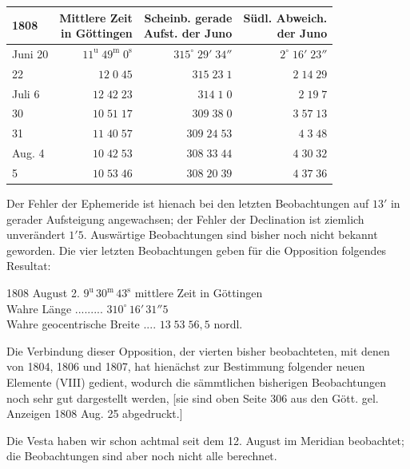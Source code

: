 \begin{center}\fontsize{10}{12}\selectfont\setlength{\tabcolsep}{3pt}\renewcommand{\arraystretch}{1.15}\begin{tabular}{lrrr}
1808 & \shortstack{Mittlere Zeit\\in Göttingen} & \shortstack{Scheinb. gerade\\Aufst. der Juno} & \shortstack{Südl. Abweich.\\der Juno}\\\hline
Juni 20 & $11^{\text{u}}\;49^{\text{m}}\;0^{\text{s}}$ & $315^\circ\;29'\;34''$ & $2^\circ\;16'\;23''$\\
22 & $12\;0\;45$ & $315\;23\;1$ & $2\;14\;29$\\
Juli 6 & $12\;42\;23$ & $314\;1\;0$ & $2\;19\;7$\\
30 & $10\;51\;17$ & $309\;38\;0$ & $3\;57\;13$\\
31 & $11\;40\;57$ & $309\;24\;53$ & $4\;3\;48$\\
Aug. 4 & $10\;42\;53$ & $308\;33\;44$ & $4\;30\;32$\\
5 & $10\;53\;46$ & $308\;20\;39$ & $4\;37\;36$\\
\end{tabular}\end{center}


\par\indent Der Fehler der Ephemeride ist hienach bei den letzten Beobachtungen auf $13'$ in gerader Aufsteigung angewachsen; der Fehler der Declination ist ziemlich unverändert $1'5$. Auswärtige Beobachtungen sind bisher noch nicht bekannt geworden. Die vier letzten Beobachtungen geben für die Opposition folgendes Resultat:

\begin{center}
1808 August 2. $9^{\text{u}}\,30^{\text{m}}\,43^{\text{s}}$ mittlere Zeit in Göttingen\\
Wahre Länge .\;.\;.\;.\;.\;.\;.\;.\;.\; $310^\circ\,16'\,31''5$\\
Wahre geocentrische Breite .\;.\;.\;.\; $13\;53\;56,5$ nordl. \end{center}

\par\indent Die Verbindung dieser Opposition, der vierten bisher beobachteten, mit denen von 1804, 1806 und
1807, hat hienächst zur Bestimmung folgender neuen Elemente (VIII) gedient, wodurch die sämmtlichen
bisherigen Beobachtungen noch sehr gut dargestellt werden, [sie sind oben Seite 306 aus den Gött. gel.
Anzeigen 1808 Aug. 25 abgedruckt.]

\par\indent Die Vesta haben wir schon achtmal seit dem 12. August im Meridian beobachtet; die Beobachtungen sind aber noch nicht alle berechnet.

\par{}
